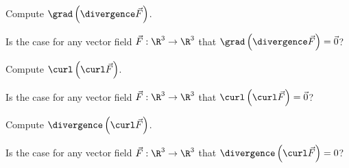 \documentclass{ximera}
\begin{document}
\begin{exercise}
  Compute \(\grad \left( \divergence \vec{F}\right)\).
  \begin{multipleChoice}
  \end{multipleChoice}
  \begin{exercise}
    Is the case for any vector field $\vec{F} : \R^3 \to \R^3$ that  \(\grad \left( \divergence \vec{F}\right) = \vec{0}\)?
    
    \begin{multipleChoice}
    \end{multipleChoice}    
  \end{exercise}
\end{exercise}

\begin{exercise}
  Compute \(\curl \left( \curl \vec{F}\right)\).
  \begin{multipleChoice}
  \end{multipleChoice}

  \begin{exercise}
    Is the case for any vector field $\vec{F} : \R^3 \to \R^3$ that  \(\curl \left( \curl \vec{F}\right) = \vec{0}\)?

    \begin{multipleChoice}
    \end{multipleChoice}    
  \end{exercise}
\end{exercise}

\begin{exercise}
  Compute \(\divergence \left( \curl \vec{F}\right)\).
  \begin{multipleChoice}
  \end{multipleChoice}
  
  \begin{exercise}
    Is the case for any vector field $\vec{F} : \R^3 \to \R^3$ that  \(\divergence \left( \curl \vec{F}\right) = 0\)?
    
    \begin{multipleChoice}
    \end{multipleChoice}    
  \end{exercise}
\end{exercise}
\end{document}
